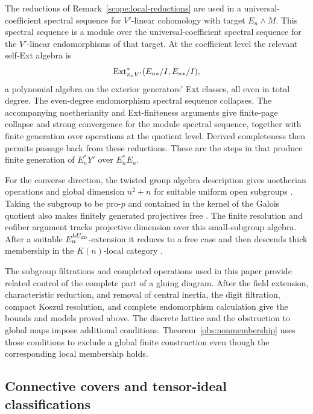 \begin{remark}
\label{scope:local-resolutions}
The reductions of Remark~\ref{scope:local-reductions} are used in a
universal-coefficient spectral sequence for \(V'\)-linear cohomology
with target \(E_n\wedge M\).  This spectral sequence is a module
over the universal-coefficient spectral sequence for the
\(V'\)-linear endomorphisms of that target.  At the coefficient
level the relevant self-Ext algebra is
\[
 \operatorname{Ext}_{\pi_*V'}^*(E_{n*}/I,E_{n*}/I),
\]
a polynomial algebra on the exterior generators' Ext classes, all
even in total degree.  The even-degree endomorphism spectral sequence
collapses.  The accompanying noetherianity and Ext-finiteness
arguments give finite-page collapse and strong convergence for the
module spectral sequence, together with finite generation over
operations at the quotient level.  Derived completeness then permits
passage back from these reductions.  These are the steps in
\cite[Lemmas~4.7--4.9 and Proposition~4.11]{LP2026} that produce
finite generation of \(E_n^*Y'\) over \(E_n^*E_n\).

For the converse direction, the twisted group algebra description
gives noetherian operations and global dimension \(n^2+n\) for
suitable uniform open subgroups
\cite[Proposition~2.12 and Corollary~2.13]{LP2026}.  Taking the
subgroup to be pro-\(p\) and contained in the kernel of the Galois
quotient also makes finitely generated projectives free
\cite[Proposition~2.14 and Corollary~2.15]{LP2026}.  The finite
resolution and cofiber argument tracks projective dimension over this
small-subgroup algebra.  After a suitable
\(E_n^{hU_{\rm gp}}\)-extension it reduces to a free case and then
descends thick membership in the \(K(n)\)-local category
\cite[Lemmas~4.4--4.5 and the proof of Theorem~4.3]{LP2026}.

The subgroup filtrations and completed operations used in this paper
provide related control of the complete part of a gluing diagram.
After the field extension, characteristic reduction, and removal of
central inertia, the digit filtration, compact Koszul resolution, and
complete endomorphism calculation give the bounds and models proved
above.  The discrete lattice and the obstruction to global maps impose
additional conditions.  Theorem~\ref{obs:nonmembership} uses
those conditions to exclude a global finite construction even though
the corresponding local membership holds.
\end{remark}

\subsection{Connective covers and tensor-ideal classifications}

